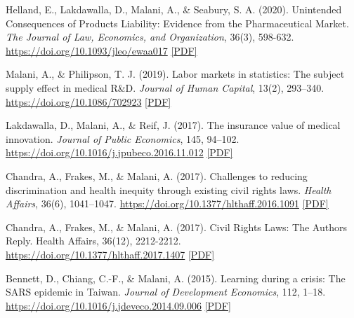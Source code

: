 \begin{tablist}
        \item[2020] \tab{}Helland, E., Lakdawalla, D., Malani, A., \& Seabury, S. A. (2020). Unintended Consequences of Products Liability: Evidence from the Pharmaceutical Market. \textit{The Journal of Law, Economics, and Organization}, 36(3), 598-632. \href{https://doi.org/10.1093/jleo/ewaa017}{https://doi.org/10.1093/jleo/ewaa017} \href{https://github.com/anup-malani/website_personal/blob/main/publications/2020_HellandMalaniEtAl_JLEO_PharmaProductsLiability.pdf}{[PDF]} 
        
        \item[2019] \tab{}Malani, A., \& Philipson, T. J. (2019). Labor markets in statistics: The subject supply effect in medical R\&D. \textit{Journal of Human Capital}, 13(2), 293–340. \href{https://doi.org/10.1086/702923}{https://doi.org/10.1086/702923} \href{https://github.com/anup-malani/website_personal/blob/main/publications/2019_MalaniPhilipson_JHC_TrialSubjectMarket.pdf}{[PDF]}
        
        \item[2017] \tab{}Lakdawalla, D., Malani, A., \& Reif, J. (2017). The insurance value of medical innovation. \textit{Journal of Public Economics}, 145, 94–102. \href{https://doi.org/10.1016/j.jpubeco.2016.11.012}{https://doi.org/10.1016/j.jpubeco.2016.11.012} \href{https://github.com/anup-malani/website_personal/blob/main/publications/2017_LakdawallaMalaniReif_JPubEcon_ValueInnovation.pdf}{[PDF]}
        
        \item[2017] \tab{}Chandra, A., Frakes, M., \& Malani, A. (2017). Challenges to reducing discrimination and health inequity through existing civil rights laws. \textit{Health Affairs}, 36(6), 1041–1047. \href{https://doi.org/10.1377/hlthaff.2016.1091}{https://doi.org/10.1377/hlthaff.2016.1091} \href{https://github.com/anup-malani/website_personal/blob/main/publications/2017_ChandraFrakesMalani_HealthAffairs_CivilRights.pdf}{[PDF]}

        \item[] \tab{}Chandra, A., Frakes, M., \& Malani, A. (2017). Civil Rights Laws: The Authors Reply. Health Affairs, 36(12), 2212-2212. \href{https://doi.org/10.1377/hlthaff.2017.1407}{https://doi.org/10.1377/hlthaff.2017.1407} \href{https://github.com/anup-malani/website_personal/blob/main/publications/2017_ChandraMalani_ReplyCivilRights.pdf}{[PDF]}
        
        \item[2015] \tab{}Bennett, D., Chiang, C.-F., \& Malani, A. (2015). Learning during a crisis: The SARS epidemic in Taiwan. \textit{Journal of Development Economics}, 112, 1–18. \href{https://doi.org/10.1016/j.jdeveco.2014.09.006}{https://doi.org/10.1016/j.jdeveco.2014.09.006} \href{https://github.com/anup-malani/website_personal/blob/main/publications/2015_BennettChiangMalani_JDE_SARSLearning.pdf}{[PDF]}
        

\end{tablist}
